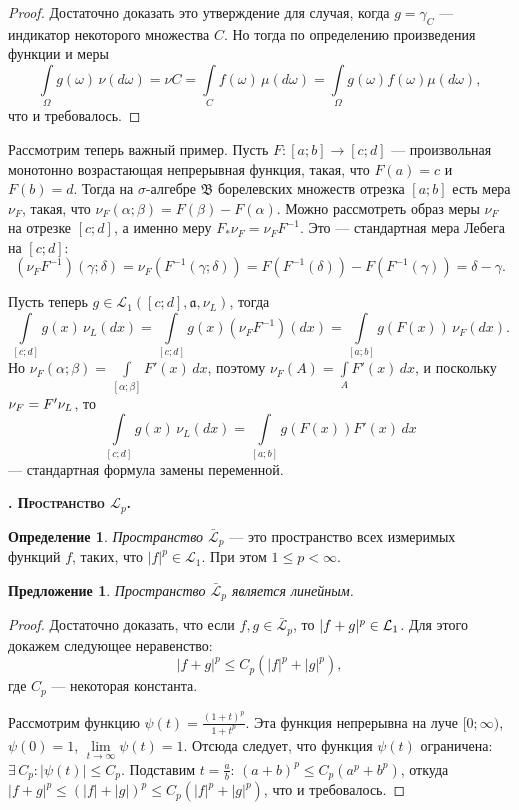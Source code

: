 \documentclass[12pt,titlepage]{article}
\newcounter{tema}
\renewcommand{\thetema}{\arabic{tema}}
\newcommand*{\tema}[1]{\vspace{10pt}
\begin{center}{\textbf{\refstepcounter{tema}
\textsc{\thetema. #1.}}}\vspace{7pt}
\end{center}}
\newtheorem{predl}{Предложение}[tema]
\theoremstyle{definition}
\newtheorem{defen}{Определение}[tema]
\newcommand*{\p}[1]{#1\nobreak\discretionary{}{\hbox{$\mathsurround=0pt #1$}}{}}
\begin{document}
\begin{proof}
Достаточно доказать это утверждение для случая, когда $g=\gamma_C$
--- индикатор некоторого множества $C$. Но тогда по определению
произведения функции и меры
$$\int\limits_\Omega\!g(\omega)\,\nu(d\omega)=\nu C=\int\limits_C\!f(\omega)\,\mu(d\omega)=
\int\limits_\Omega\!g(\omega)f(\omega)\mu(d\omega),$$ что и
требовалось.
\end{proof}

Рассмотрим теперь важный пример. Пусть $F\colon [a;b]\to [c;d]$ ---
произвольная монотонно возрастающая непрерывная функция, такая, что
$F(a)=c$ и $F(b)=d$. Тогда на $\sigma$-алгебре $\mathfrak{B}$
борелевских множеств отрезка $[a;b]$ есть мера $\nu_F$, такая, что
$\nu_F(\alpha;\beta)=F(\beta)-F(\alpha)$. Можно рассмотреть образ
меры $\nu_F$ на отрезке $[c;d]$, а именно меру
$F_*\nu_F=\nu_FF^{-1}$. Это
--- стандартная мера Лебега на $[c;d]$: $$(\nu_FF^{-1})(\gamma;\delta)=\nu_F(F^{-1}
(\gamma;\delta))=F(F^{-1}(\delta))-F(F^{-1}(\gamma))=\delta-\gamma.$$

Пусть теперь $g\in\mathcal{L}_1([c;d],\mathfrak{a},\nu_L)$, тогда
$$\int\limits_{[c;d]}\!g(x)\,\nu_L(dx)=\int\limits_{[c;d]}\!g(x)(\nu_FF^{-1})(dx)=\int\limits
_{[a;b]}\!g(F(x))\,\nu_F(dx).$$ Но
$\nu_F(\alpha;\beta)=\int\limits_{[\alpha;\beta]}\!F'(x)\,dx$,
поэтому $\nu_F(A)=\int\limits_A\!F'(x)\,dx$, и поскольку
$\nu_F\p=F'\nu_L$, то
$$\int\limits_{[c;d]}\!g(x)\,\nu_L(dx)=\int\limits_{[a;b]}\!g(F(x))F'(x)\,dx$$
--- стандартная формула замены переменной.

 \tema{Пространство $\mathcal{L}_p$}

\begin{defen}
\emph{Пространство $\mathcal{\bar{L}}_p$} --- это пространство всех
измеримых функций $f$, таких, что $|f|^p\in\mathcal{L}_1$. При этом
$1\leqslant p<\infty$.
\end{defen}

\begin{predl}
Пространство $\mathcal{\bar{L}}_p$ является линейным.
\end{predl}

\begin{proof}
Достаточно доказать, что если $f,g\in\mathcal{\bar{L}}_p$, то
$|f+g|^p\p\in\mathcal{L}_1$. Для этого докажем следующее
неравенство:
$$|f+g|^p\leqslant C_p(|f|^p+|g|^p),$$ где $C_p$ --- некоторая
константа.

Рассмотрим функцию $\psi(t)=\frac{(1+t)^p}{1+t^p}$. Эта функция
непрерывна на луче $[0;\infty)$, $\psi(0)=1$,
$\lim\limits_{t\to\infty} \psi(t)=1$. Отсюда следует, что функция
$\psi(t)$ ограничена: $\exists\, C_p: |\psi(t)|\leqslant C_p$.
Подставим $t=\frac a b$: $(a+b)^p\leqslant C_p(a^p+b^p)$, откуда
$|f+g|^p\leqslant(|f|+|g|)^p\leqslant C_p(|f|^p+|g|^p)$, что и
требовалось.
\end{proof}
\end{document}
